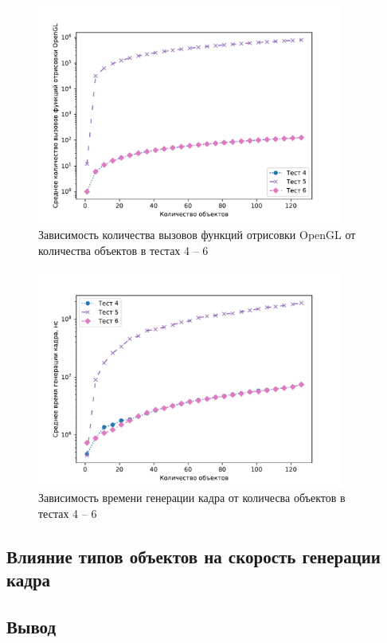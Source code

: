 \begin{figure}[H]
	\centering
    \includegraphics[width=0.9\textwidth]{img/456/plot_draw_calls.pdf}
	\caption{Зависимость количества вызовов функций отрисовки OpenGL от количества объектов в тестах 4 -- 6}
	\label{fig:456:dc}
\end{figure}

\begin{figure}[H]
	\centering
    \includegraphics[width=0.9\textwidth]{img/456/plot_time.pdf}
	\caption{Зависимость времени генерации кадра от количесва объектов в тестах 4 -- 6}
	\label{fig:456:time}
\end{figure}


\subsection{Влияние типов объектов на скорость генерации кадра}


\subsection*{Вывод}

